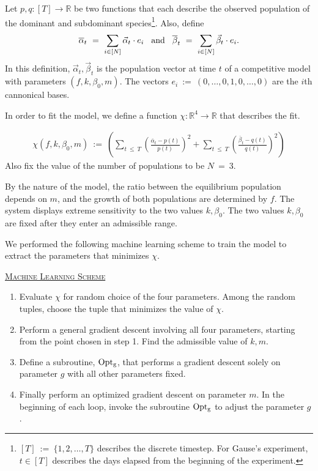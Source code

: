 \documentclass[11pt,reqno]{amsart}
\numberwithin{equation}{section}
\theoremstyle{plain}
\newcommand{\textAnd}{\hspace{3mm}\textnormal{and}\hspace{3mm}}
\begin{document}
Let $p, q:[T]\rightarrow \mathbb R$ be two functions that each describe 
the observed population of the dominant and subdominant species\footnote{$[T] \ := \ \{1, 2, \dots, T\}$ describes the discrete timestep. For Gause's experiment, $t\in[T]$ describes the days elapsed from the beginning of the experiment. }. Also, define 
\begin{align}
    \overline\alpha_t \ = \ \sum_{i \in [N]} \vec \alpha_t \cdot e_i 
    \textAnd 
    \overline \beta_t \ = \ \sum_{i \in [N]} \vec \beta_t \cdot e_i.
\end{align}
In this definition, $\vec \alpha_t, \vec \beta_t$ is the population vector at time $t$ of a competitive model with parameters $(f, k, \beta_0, m)$. The vectors $e_i \ := \ (0, \dots, 0, 1, 0, \dots, 0)$ are the $i$th 
cannonical bases.

In order to fit the model, we define a function $\chi: \mathbb R^4 \rightarrow \mathbb R$ 
that describes the fit. 

\begin{align}
    \chi(f, k, \beta_0, m) \ := \ 
\left(\sum_{t \ \leq \  T} \left(\frac{\overline \alpha_t - p(t)} {p(t)}\right)^2 + 
    \sum_{t \ \leq \  T} \left(\frac{\overline \beta_t - q(t)} {q(t)}\right)^2
    \right)
\end{align}
Also fix the value of the number of populations to be $N \ = \  3$. 

By the nature of the model, the ratio between the equilibrium population depends on $m$, and the growth of both populations are determined by $f$. The system displays extreme sensitivity to the two values $k, \beta_0$. The two values $k, \beta_0$ are fixed after they enter an admissible range. 

We performed the following machine learning scheme to train the model to extract the parameters that minimizes $\chi$. 

\vspace{2mm}

\underline{\textsc{Machine Learning Scheme}}
\begin{enumerate}
    \item Evaluate $\chi$ for random choice of the four parameters. 
    Among the random tuples, choose the tuple that minimizes the value of $\chi$. 
    \item Perform a general gradient descent involving all four parameters, starting from the point chosen in step 1. Find the admissible value of $k, m$. 
    \item Define a subroutine, $\rm{Opt_g}$, that performs a gradient descent solely on parameter $g$ 
    with all other parameters fixed. 
    \item Finally perform an optimized gradient descent on parameter $m$. In the beginning of each loop, invoke the subroutine $\rm{Opt_g}$ to adjust the parameter $g$. 
\end{enumerate}
\end{document}
